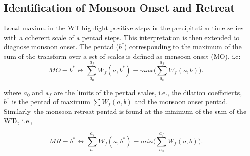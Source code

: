 \subsection{Identification of Monsoon Onset and Retreat}

Local maxima in the WT highlight positive steps in the precipitation time series with a coherent scale of $a$ pentad steps. This interpretation is then extended to diagnose monsoon onset. 
 The pentad ($b^*$) corresponding to the maximum of the sum of the transform over a set of scales is defined as monsoon onset (MO), i.e: 
\begin{equation}
MO=b^* \Leftrightarrow \sum_{a_0}^{a_f} W_f(a,b^*)=max\bigg(\sum_{a_0}^{a_f} W_f(a,b)\bigg).
\label{eq:mo}
\end{equation}

\noindent where $a_0$ and $a_f$ are the limits of the pentad scales, i.e., the dilation coefficients, $b^*$ is the pentad of maximum $\sum W_f(a,b)$ and the monsoon onset pentad.
Similarly, the monsoon retreat pentad is found at the minimum of the sum of the WTs, i.e.,

 \begin{equation}
MR=b^* \Leftrightarrow \sum_{a_0}^{a_f} W_f(a,b^*)=min\bigg(\sum_{a_0}^{a_f} W_f(a,b)\bigg).
\label{eq:mr}
\end{equation}

